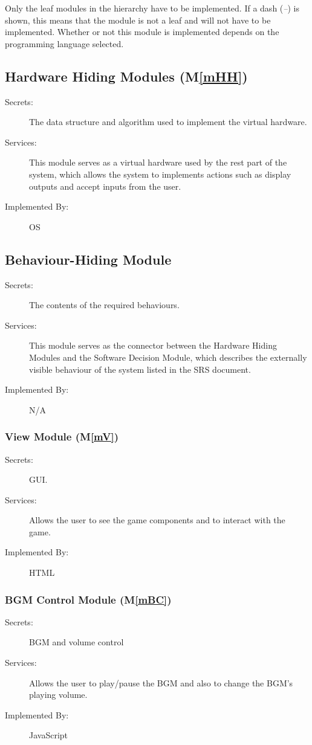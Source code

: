 \documentclass[12pt, titlepage]{article}
\newcommand{\mref}[1]{M\ref{#1}}
\begin{document}
Only the leaf modules in the
hierarchy have to be implemented. If a dash (\emph{--}) is shown, this means
that the module is not a leaf and will not have to be implemented. Whether or
not this module is implemented depends on the programming language
selected.

\subsection{Hardware Hiding Modules (\mref{mHH})}
\begin{description}
\item[Secrets:]The data structure and algorithm used to implement the virtual
  hardware.
\item[Services:] This module serves as a virtual hardware used by the rest part of the system, which allows the system to implements actions such as display outputs and accept inputs from the user.
\item[Implemented By:] OS
\end{description}

\subsection{Behaviour-Hiding Module}
\begin{description}
\item[Secrets:]The contents of the required behaviours.
\item[Services:]This module serves as the connector between the Hardware Hiding Modules and the Software Decision Module, which describes the externally visible behaviour of the system listed in the SRS document.
\item[Implemented By:] N/A
\end{description}

\subsubsection{View Module (\mref{mV})}
\begin{description}
\item[Secrets:] GUI.
\item[Services:] Allows the user to see the game components and to interact with the game.
\item[Implemented By:]HTML
\end{description}

\subsubsection{BGM Control Module (\mref{mBC})}
\begin{description}
\item[Secrets:] BGM and volume control
\item[Services:] Allows the user to play/pause the BGM and also to change the BGM's playing volume.
\item[Implemented By:]JavaScript
\end{description}
\end{document}

